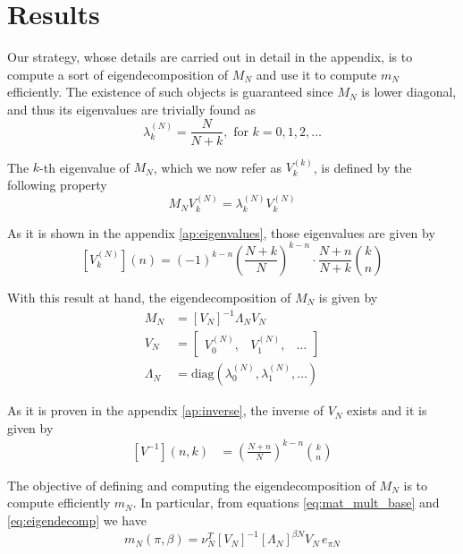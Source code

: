 \documentclass{article}
\newcommand{\ppar}[1]{\left( #1 \right)}
\newcommand{\spar}[1]{\left[ #1 \right]}
\begin{document}

\section{Results}

Our strategy, whose details are carried out in detail in the appendix, is to compute a sort of eigendecomposition of $M_N$ and use it to compute $m_N$ efficiently.
%
The existence of such objects is guaranteed since $M_N$ is lower diagonal, and thus its eigenvalues are trivially found as
\begin{equation}
    \lambda^{(N)}_k = \frac{N}{N+k}, \text{ for } k=0,1, 2, \dots
\end{equation}

The $k$-th eigenvalue of $M_N$, which we now refer as $V_k^{(k)}$, is defined by the following property
\begin{equation}
    M_N V_k^{(N)} = \lambda^{(N)}_k V_k^{(N)}
\end{equation}

As it is shown in the appendix \ref{ap:eigenvalues}, those eigenvalues are given by
\begin{equation}
    \spar{V_k^{(N)}}(n) =
    (-1)^{k-n} \ppar{\frac{N+k}{N}}^{k-n} \cdot \frac{N+n}{N+k} \binom{k}{n}
\end{equation}

With this result at hand, the eigendecomposition of $M_N$ is given by
\begin{align}
    M_N &= \spar{V_N}^{-1} \Lambda_N V_N 
    \label{eq:eigendecomp}
    \\
    V_N &= \begin{bmatrix}
        V_0^{(N)}, & V_1^{(N)}, & \dots
    \end{bmatrix} \\
    \Lambda_N &= \text{diag}\ppar{\lambda^{(N)}_0, \lambda^{(N)}_1, \dots}
\end{align}

As it is proven in the appendix \ref{ap:inverse}, the inverse of $V_N$ exists and it is given by
\begin{align}
    \spar{V^{-1}}(n,k) &=
    \ppar{\frac{N+n}{N}}^{k-n} \binom{k}{n}
\end{align}

The objective of defining and computing the eigendecomposition of $M_N$ is to compute efficiently $m_N$.
%
In particular, from equations \eqref{eq:mat_mult_base} and \eqref{eq:eigendecomp} we have
\begin{equation}
    m_N(\pi, \beta) = \nu_N^T 
    \spar{V_N}^{-1} \spar{\Lambda_N}^{\beta N} V_N\,
    e_{\pi N}
\end{equation}
\end{document}
